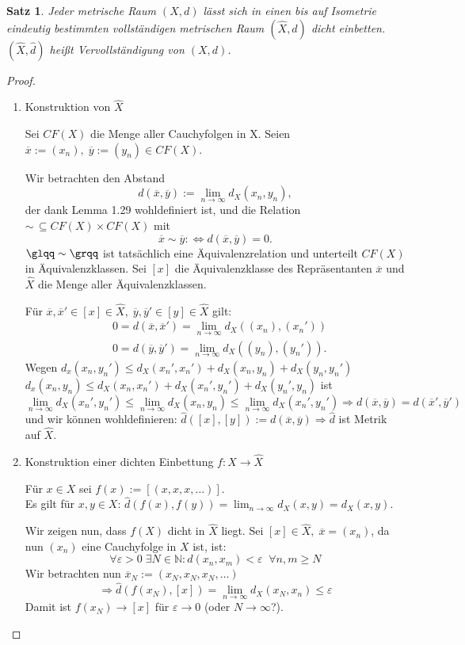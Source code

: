 \documentclass[ngerman]{report}
\theoremstyle{plain}%
\newtheorem{thm}{Satz}[chapter]
\theoremstyle{definition}%
\theoremstyle{myStyle}
\newcommand{\N}{\mathbb{N}}
\newcommand{\dX}{\hat{X}}%
\newcommand{\dd}{\hat{d}}%
\newcommand{\olx}{\overline{x}} %
\newcommand{\oly}{\overline{y}}
\newcommand{\df}[1][]{%
	\overset{#1}{\Rightarrow}
}
\begin{document}
\begin{thm}%
	Jeder metrische Raum $(X,d)$ lässt sich in einen bis auf Isometrie eindeutig bestimmten vollständigen metrischen Raum $(\dX,\dd)$ dicht einbetten. $(\dX,\dd)$ heißt Vervollständigung von $(X,d)$.
\end{thm}
\begin{proof}
	\begin{enumerate}[(1)]
		\item Konstruktion von $\dX$\par
		
		Sei $CF(X)$ die Menge aller Cauchyfolgen in X. Seien $\overline{x}:=(x_n),\;\overline{y}:=(y_n) \in CF(X)$.\par 
		Wir betrachten den \glqq Abstand\grqq  $$ d(\overline{x},\overline{y}):=\lim_{n\to\infty} d_X(x_n,y_n),$$ der dank Lemma 1.29 wohldefiniert ist,
		und die Relation $\sim\, \subseteq CF(X) \times CF(X)$ mit
		$$\overline{x} \sim \overline{y} :\Leftrightarrow d(\olx,\oly) = 0.$$
		$\glqq \sim \grqq$ ist tatsächlich eine Äquivalenzrelation und unterteilt $CF(X)$ in Äquivalenzklassen. Sei $[x]$ die Äquivalenzklasse des Repräsentanten $\olx$ und $\dX$ die Menge aller Äquivalenzklassen.\par 
		Für $\olx,\olx'\in [x]\in \dX,\;\oly,\oly'\in [y]\in\dX$ gilt: 
		\begin{equation*}
			\begin{split}
			& 0=d(\olx,\olx') = \lim_{n\to \infty} d_X((x_n),(x_n'))\\
			& 0=d(\oly,\oly') = \lim_{n\to \infty} d_X((y_n),(y_n')).
			\end{split}
		\end{equation*}
		Wegen $d_x(x_n,y_n') \leq d_X(x_n',x_n')+d_X(x_n,y_n)+d_X(y_n,y_n')$\\
		$d_x(x_n,y_n) \leq d_X(x_n,x_n')+d_X(x_n',y_n')+d_X(y_n',y_n)$ ist
		$$\lim_{n\to\infty} d_X(x_n',y_n')\leq \lim_{n\to\infty} d_X(x_n,y_n) \leq \lim_{n\to\infty} d_X(x_n',y_n')\df d(\olx,\oly)=d(\olx',\oly')$$
		und wir können 	wohldefinieren: $\dd([x],[y]):=d(\olx,\oly)\df \dd$ ist Metrik auf $\dX$.

		\item Konstruktion einer dichten Einbettung $f:X\to \dX$\par
		
		Für $x\in X$ sei $f(x):=[(x,x,x,\dots)]$.\\
		Es gilt für $x,y\in X$: $\dd(f(x),f(y)) = \lim_{n\to\infty}d_X(x,y)=d_X(x,y)$.\par 
		Wir zeigen nun, dass $f(X)$ dicht in $\dX$ liegt. Sei $[x]\in\dX,\;\olx=(x_n)$, da nun $(x_n)$ eine Cauchyfolge in $X$ ist, ist:
		$$\forall \varepsilon >0\; \exists N\in\N : d(x_n,x_m)< \varepsilon \;\;\forall n,m \geq N$$
		Wir betrachten nun $\olx_N := (x_N,x_N,x_N,\dots)$ $$\df \dd(f(x_N),[x])=\lim_{n\to\infty} d_X(x_N,x_n)\leq \varepsilon$$ 
		Damit ist $f(x_N)\to [x]$ für $\varepsilon \to 0$ (oder $N\to\infty$?).


\end{enumerate}
\end{proof}
\end{document}
